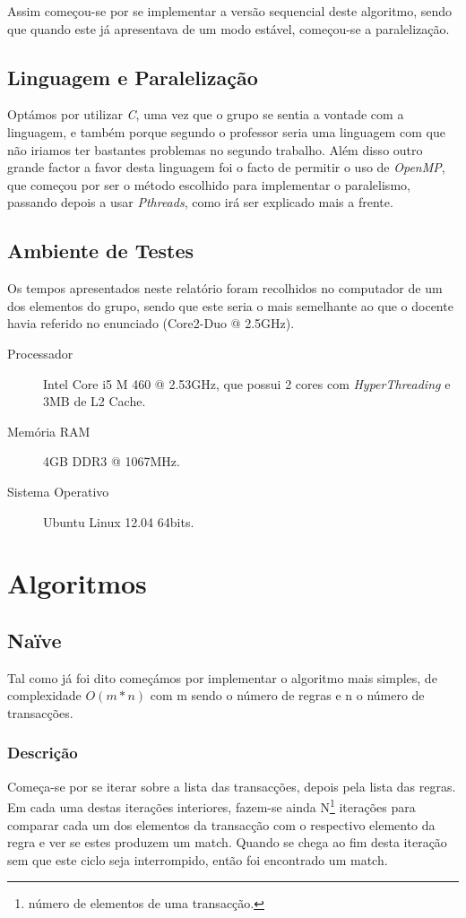 \documentclass[a4paper]{article}
\begin{document}
Assim começou-se por se implementar a versão sequencial deste algoritmo, sendo que quando este já apresentava de um modo estável, começou-se a paralelização.

\subsection{Linguagem e Paralelização}
\indent \indent Optámos por utilizar \textit{C}, uma vez que o grupo se sentia a vontade com a linguagem, e também porque segundo o professor seria uma linguagem com que não iriamos ter bastantes problemas no segundo trabalho. Além disso outro grande factor a favor desta linguagem foi o facto de permitir o uso de \textit{OpenMP}, que começou por ser o método escolhido para implementar o paralelismo, passando depois a usar \textit{Pthreads}, como irá ser explicado mais a frente.

\subsection{Ambiente de Testes}
\indent \indent Os tempos apresentados neste relatório foram recolhidos no computador de um dos elementos do grupo, sendo que este seria o mais semelhante ao que o docente havia referido no enunciado (Core2-Duo @ 2.5GHz).
\begin{description}
	\item [Processador] Intel Core i5 M 460 @ 2.53GHz, que possui 2 cores com \textit{HyperThreading} e 3MB de L2 Cache.
	\item [Memória RAM] 4GB DDR3 @ 1067MHz.
	\item [Sistema Operativo] Ubuntu Linux 12.04 64bits.
\end{description}
\clearpage

\section{Algoritmos}
\subsection{Naïve}
\indent \indent Tal como já foi dito começámos por implementar o algoritmo mais simples, de complexidade $O(m * n)$ com m sendo o número de regras e n o número de transacções.

\subsubsection{Descrição}
Começa-se por se iterar sobre a lista das transacções, depois pela lista das regras. Em cada uma destas iterações interiores, fazem-se ainda N\footnote{número de elementos de uma transacção.} iterações para comparar cada um dos elementos da transacção com o respectivo elemento da regra e ver se estes produzem um match. Quando se chega ao fim desta iteração sem que este ciclo seja interrompido, então foi encontrado um match.
\end{document}
